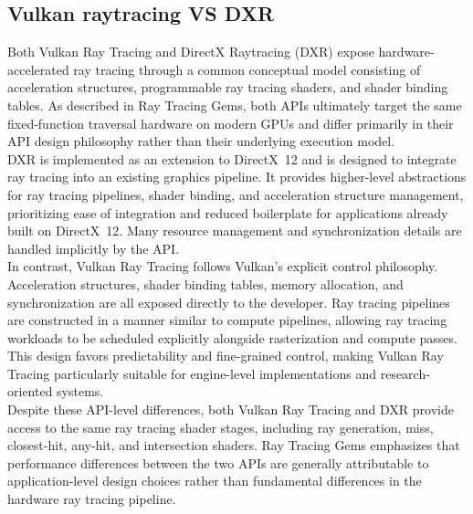 \documentclass[12pt,a4paper]{report}
\begin{document}
\subsection{Vulkan raytracing VS DXR}
Both Vulkan Ray Tracing and DirectX Raytracing (DXR) expose hardware-accelerated ray tracing through a common conceptual model consisting of acceleration structures, programmable ray tracing shaders, and shader binding tables.
As described in Ray Tracing Gems, both APIs ultimately target the same fixed-function traversal hardware on modern GPUs and differ primarily in their API design philosophy rather than their underlying execution model.\\

DXR is implemented as an extension to DirectX~12 and is designed to integrate ray tracing into an existing graphics pipeline\cite{luna2016dx12}.
It provides higher-level abstractions for ray tracing pipelines, shader binding, and acceleration structure management, prioritizing ease of integration and reduced boilerplate for applications already built on DirectX~12\cite{marrs2021raytracinggems2}.
Many resource management and synchronization details are handled implicitly by the API.\\

In contrast, Vulkan Ray Tracing follows Vulkan’s explicit control philosophy.
Acceleration structures, shader binding tables, memory allocation, and synchronization are all exposed directly to the developer.
Ray tracing pipelines are constructed in a manner similar to compute pipelines, allowing ray tracing workloads to be scheduled explicitly alongside rasterization and compute passes.
This design favors predictability and fine-grained control, making Vulkan Ray Tracing particularly suitable for engine-level implementations and research-oriented systems.\\

Despite these API-level differences, both Vulkan Ray Tracing and DXR provide access to the same ray tracing shader stages, including ray generation, miss, closest-hit, any-hit, and intersection shaders.
Ray Tracing Gems emphasizes that performance differences between the two APIs are generally attributable to application-level design choices rather than fundamental differences in the hardware ray tracing pipeline.
\par
\end{document}
